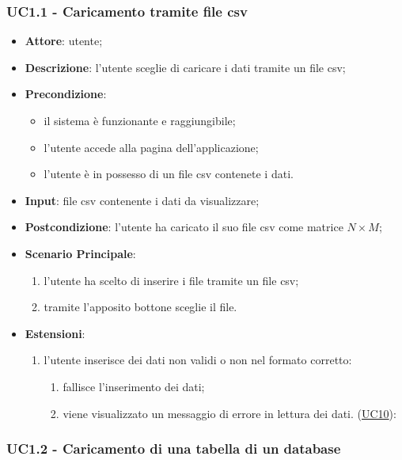     \subsubsection{UC1.1 - Caricamento tramite file csv}
    \label{uc1.1}
    
    \begin{itemize}
    \item \textbf{Attore}: utente;
    \item \textbf{Descrizione}: l'utente sceglie di caricare i dati tramite un file csv;
    \item \textbf{Precondizione}:
    \begin{itemize}
        \item il sistema è funzionante e raggiungibile;
        \item l'utente accede alla pagina dell'applicazione;
        \item l'utente è in possesso di un file csv contenete i dati.
    \end{itemize}
    \item \textbf{Input}: file csv contenente i dati da visualizzare;
    \item \textbf{Postcondizione}: l'utente ha caricato il suo file csv come matrice $N\times M$;
    \item \textbf{Scenario Principale}: 
        \begin{enumerate}
            \item l'utente ha scelto di inserire i file tramite un file csv;
            \item tramite l'apposito bottone sceglie il file.
        \end{enumerate}
        \item \textbf{Estensioni}:
        \begin{enumerate}
            \item l'utente inserisce dei dati non validi o non nel formato corretto:
                \begin{enumerate}
                    \item fallisce l'inserimento dei dati;
                    \item viene visualizzato un messaggio di errore in lettura dei dati. (\hyperref[uc10]{UC10}):
                \end{enumerate}
        \end{enumerate}  
    \end{itemize}

    
    \subsubsection{UC1.2 - Caricamento di una tabella di un database}
    \label{uc1.2}
    
